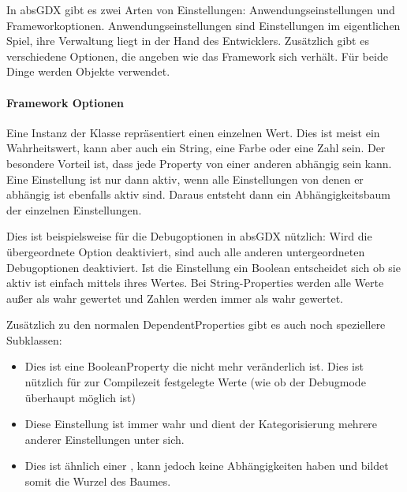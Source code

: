 
In absGDX gibt es zwei Arten von Einstellungen: Anwendungseinstellungen und Frameworkoptionen.
Anwendungseinstellungen sind Einstellungen im eigentlichen Spiel, ihre Verwaltung liegt in der Hand des Entwicklers.
Zusätzlich gibt es verschiedene Optionen, die angeben wie das Framework sich verhält. Für beide Dinge werden  Objekte verwendet.

\paragraph{Framework Optionen}

Eine Instanz der Klasse  repräsentiert einen einzelnen Wert. Dies ist meist ein Wahrheitswert, kann aber auch ein String, eine Farbe oder eine Zahl sein.
Der besondere Vorteil ist, dass jede Property von einer anderen abhängig sein kann. Eine Einstellung ist nur dann aktiv, wenn alle Einstellungen von denen er abhängig ist ebenfalls aktiv sind. Daraus entsteht dann ein Abhängigkeitsbaum der einzelnen Einstellungen.


Dies ist beispielsweise für die Debugoptionen in absGDX nützlich: Wird die übergeordnete Option  deaktiviert, sind auch alle anderen untergeordneten Debugoptionen deaktiviert. 
Ist die Einstellung ein Boolean entscheidet sich ob sie aktiv ist einfach mittels ihres Wertes. 
Bei String-Properties werden alle Werte außer  als wahr gewertet und Zahlen werden immer als wahr gewertet.

Zusätzlich zu den normalen DependentProperties gibt es auch noch speziellere Subklassen:

\begin{itemize}
\item {} Dies ist eine BooleanProperty die nicht mehr veränderlich ist. Dies ist nützlich für zur Compilezeit festgelegte Werte (wie ob der Debugmode überhaupt möglich ist)
\item {} Diese Einstellung ist immer wahr und dient der Kategorisierung mehrere anderer Einstellungen unter sich.
\item {} Dies ist ähnlich einer , kann jedoch keine Abhängigkeiten haben und bildet somit die Wurzel des Baumes.
\end{itemize}